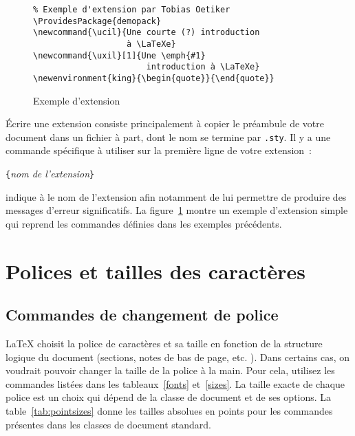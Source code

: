 \begin{figure}[!htbp]
\begin{lined}{\textwidth}
\begin{verbatim}
% Exemple d'extension par Tobias Oetiker
\ProvidesPackage{demopack}
\newcommand{\ucil}{Une courte (?) introduction
                   à \LaTeXe}
\newcommand{\uxil}[1]{Une \emph{#1}
                       introduction à \LaTeXe}
\newenvironment{king}{\begin{quote}}{\end{quote}}
\end{verbatim}
\end{lined}
\caption{Exemple d'extension} \label{package}
\end{figure}

Écrire une extension consiste principalement à copier le préambule de
votre document dans un fichier à part, dont le nom se termine par
\texttt{.sty}. Il y a une commande spécifique à utiliser sur la
première ligne de votre extension~:

\begin{lscommand}
\verb|{|\emph{nom de l'extension}\verb|}|
\end{lscommand}

\noindent  {} indique à \LaTeXe{} le nom de
l'extension afin notamment de lui permettre de produire des messages
d'erreur significatifs. La figure~\ref{package} montre un exemple
d'extension simple qui reprend les commandes définies dans les
exemples précédents.

\section{Polices et tailles des caractères}
\label{sec:fontsize}

\subsection{Commandes de changement de police}
\LaTeX{} choisit la police de caractères et sa taille en fonction de la
structure logique du document (sections, notes de bas de
page, etc. ). Dans certains cas, on voudrait pouvoir changer la taille
de la police à la main. Pour cela, utilisez les commandes listées dans
les tableaux~\ref{fonts} et~\ref{sizes}. La taille exacte de chaque
police est un choix qui dépend de la classe de document et de ses
options. La table~\ref{tab:pointsizes} donne les tailles absolues en
points pour les commandes présentes dans les classes de document
standard.

